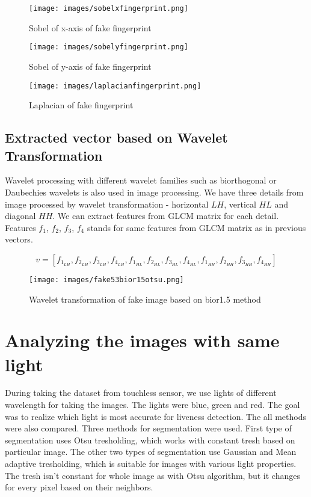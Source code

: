 \documentclass{article}
\begin{document}
\begin{figure}[!htbp]
  \begin{minipage}[b]{0.3\linewidth}
    \centering
    \texttt{[image: images/sobelxfingerprint.png]}
    \caption{Sobel of x-axis of fake fingerprint}
  \end{minipage}
  \hspace{0.3cm}
  \begin{minipage}[b]{0.3\linewidth}
    \centering
    \texttt{[image: images/sobelyfingerprint.png]}
    \caption{Sobel of y-axis of fake fingerprint}
  \end{minipage}
  \hspace{0.3cm}
    \begin{minipage}[b]{0.3\linewidth}
    \centering
    \texttt{[image: images/laplacianfingerprint.png]}
    \caption{Laplacian of fake fingerprint}
  \end{minipage}
\end{figure}

\subsection{Extracted vector based on Wavelet Transformation}
Wavelet processing with different wavelet families such as biorthogonal or Daubechies wavelets is also used in image processing. We have three details from image processed by wavelet transformation - horizontal $LH$, vertical $HL$ and diagonal $HH$. We can extract features from GLCM matrix for each detail. Features $f_1$, $f_2$, $f_3$, $f_4$ stands for same features from GLCM matrix as in previous vectors.

$$v = [f_1_{LH}, f_2_{LH}, f_3_{LH}, f_4_{LH}, f_1_{HL}, f_2_{HL}, f_3_{HL}, f_4_{HL}, f_1_{HH}, f_2_{HH}, f_3_{HH}, f_4_{HH}]$$

\begin{figure}[!htbp]
    \centering
    \texttt{[image: images/fake53bior15otsu.png]}
    \caption{Wavelet transformation of fake image based on bior1.5 method }
\end{figure}

\section{Analyzing the images with same light }
During taking the dataset from touchless sensor, we use lights of different wavelength for taking the images. The lights were blue, green and red. The goal was to realize which light is most accurate for liveness detection. The all methods were also compared. Three methods for segmentation were used. First type of segmentation uses Otsu tresholding, which works with constant tresh based on particular image. The other two types of segmentation use Gaussian and Mean adaptive tresholding, which is suitable for images with various light properties. The tresh isn't constant for whole image as with Otsu algorithm, but it changes for every pixel based on their neighbors.\\
\end{document}
